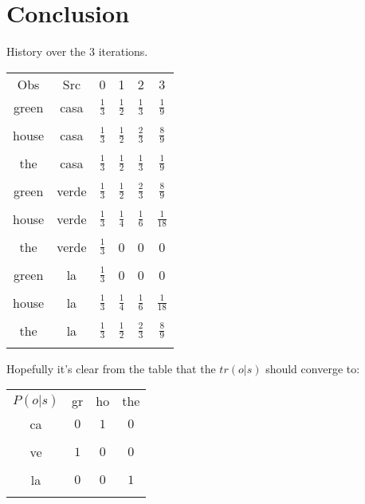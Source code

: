 \documentclass[12pt]{report}
\begin{document}
\section{Conclusion}
History over the 3 iterations.
\begin{center}
\begin{tabular}{c c c c c c}
Obs & Src & 0 & 1 & 2 & 3 \\
green & casa & $\frac{1}{3}$ & $\frac{1}{2}$ & $\frac{1}{3}$ & $\frac{1}{9}$\\\\
house & casa & $\frac{1}{3}$ & $\frac{1}{2}$ & $\frac{2}{3}$ & $\frac{8}{9}$\\\\
the & casa & $\frac{1}{3}$ & $\frac{1}{2}$ & $\frac{1}{3}$ & $\frac{1}{9}$\\\\
green & verde & $\frac{1}{3}$ & $\frac{1}{2}$ & $\frac{2}{3}$ & $\frac{8}{9}$\\\\
house & verde & $\frac{1}{3}$ & $\frac{1}{4}$ & $\frac{1}{6}$ & $\frac{1}{18}$\\\\
the & verde & $\frac{1}{3}$ & 0 & 0 & 0\\\\
green & la & $\frac{1}{3}$ & 0 & 0 & 0\\\\
house & la & $\frac{1}{3}$ & $\frac{1}{4}$ & $\frac{1}{6}$ & $\frac{1}{18}$\\\\
the & la & $\frac{1}{3}$ & $\frac{1}{2}$ & $\frac{2}{3}$ & $\frac{8}{9}$\\\\
\end{tabular}
\end{center}

Hopefully it's clear from the table that the $tr(o|s)$ should converge to:
\begin{center}
\begin{tabular}{c c c c}
$P(o|s)$ & gr & ho & the \\
ca & $0$ & $1$ & $0$ \\\\
ve & $1$ & $0$ & $0$ \\\\
la & $0$ & $0$ & $1$ \\\\
\end{tabular}
\end{center}
\end{document}
